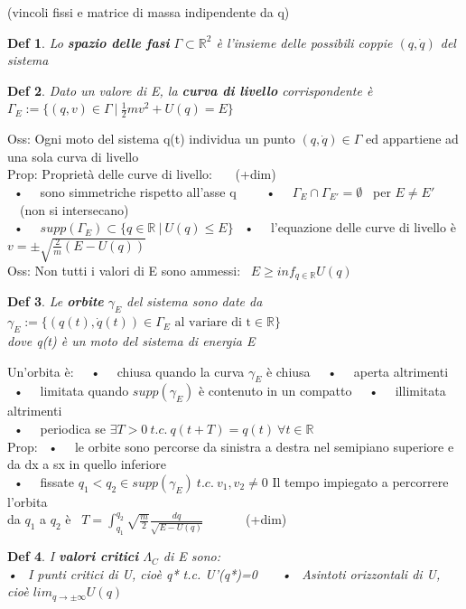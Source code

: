 \documentclass{article}
\theoremstyle{unnumbered}
\newtheorem* {theoremT}{Def}
\theoremstyle{unnumbered1}
\newenvironment{defi}{\begin{gBox}\begin{theoremT}}{\end{theoremT}\end{gBox}}
\begin{document}
(vincoli fissi e matrice di massa indipendente da q)
%
\begin{defi}
Lo \textbf{spazio delle fasi} $\Gamma \subset \mathbb{R}^2$ è l'insieme delle possibili coppie $(q,\dot{q})$ del sistema
\end{defi}
%
%
%
\begin{defi}
Dato un valore di E, la \textbf{curva di livello} corrispondente è \ \ $\Gamma_E:=\{(q,v)\in\Gamma \ | \ \frac{1}{2}mv^2 +U(q)=E\}$
\end{defi}
Oss: Ogni moto del sistema q(t) individua un punto $(q,\dot{q})\in\Gamma$ ed appartiene ad una sola curva di livello \\
Prop: Proprietà delle curve di livello: \ \ \ (+dim)\\
\ • \ \ sono simmetriche rispetto all'asse q \ \ \ 
\ • \ \ $\Gamma_E\cap\Gamma_{E'} = \emptyset$ \ per $E\neq E'$ \ \ (non si intersecano)\\
\ • \ \ $supp(\Gamma_E)\subset \{q\in\mathbb{R} \ |\ U(q) \leq E\}$ \hspace{0.3in}
\ • \ \ l'equazione delle curve di livello è $v=\pm\sqrt{\frac{2}{m}(E-U(q))}$ \\
Oss: Non tutti i valori di E sono ammessi: \ $E\ge inf_{q\in\mathbb{R}}U(q)$\\
%
%
%
\begin{defi}
Le \textbf{orbite} $\gamma_E$ del sistema sono date da $\gamma_E := \{(q(t),\dot{q}(t))\in\Gamma_E \text{ al variare di t} \in \mathbb{R}\}$\\
dove q(t) è un moto del sistema di energia E
\end{defi}
Un'orbita è: \
\ • \ \ chiusa quando la curva $\gamma_E$ è chiusa \
\ • \ \ aperta altrimenti \\
\ • \ \ limitata quando $supp(\gamma_E)$ è contenuto in un compatto \
\ • \ \ illimitata altrimenti\\
\ • \ \ periodica se $\exists T>0 \ t.c. \ q(t+T)=q(t) \ \forall t\in \mathbb{R} $ \\
Prop: \ • \ \ le orbite sono percorse da sinistra a destra nel semipiano superiore e da dx a sx in quello inferiore \\
\phantom{Prop: }\ • \ \ fissate $q_1<q_2 \in supp(\gamma_E) \ t.c. \ v_1, v_2 \neq 0$ Il tempo impiegato a percorrere l'orbita\\
\phantom{Prop: \ • \ \ }da $q_1$ a $q_2$ è \ $T=\int_{q_1}^{q_2}\sqrt{\frac{m}{2}}\frac{dq}{\sqrt{E-U(q)}}$ \ \ \ \ \ \ (+dim) \\
%
%
\begin{defi}
I \textbf{valori critici} $\Lambda_C$ di E sono:\\
• \ I punti critici di U, cioè q* t.c. U'(q*)=0 \ \ \ • \ Asintoti orizzontali di U, cioè $lim_{q\rightarrow\pm\infty}U(q)$
\end{defi}
\end{document}
